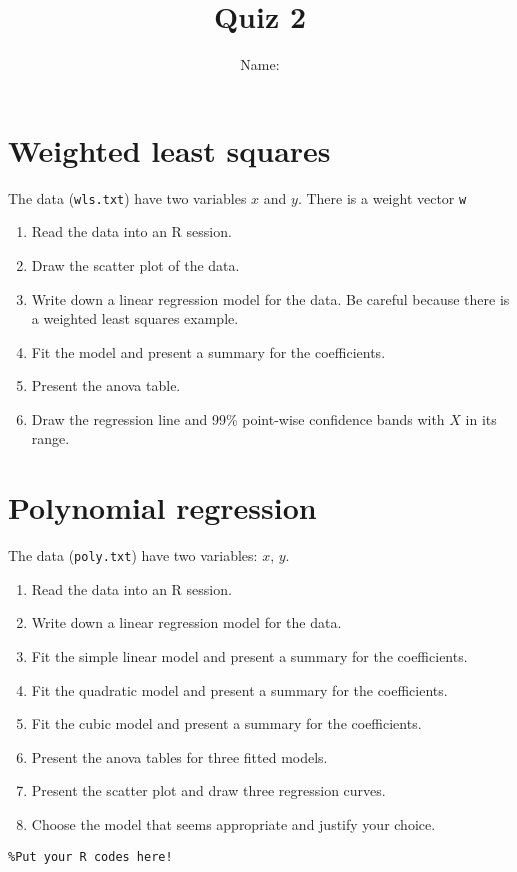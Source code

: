 \documentclass[12pt]{article}
\title{Quiz 2}
\author{Name:}%
\begin{document}
\maketitle

\section{Weighted least squares}
The data (\texttt{wls.txt}) have two variables $x$ and $y$. There is a weight vector \texttt{w}

\begin{enumerate}
\item Read the data into an R session.
\item Draw the scatter plot of the data.
\item Write down a linear regression model for the data. Be careful because there is a weighted least squares example.
\item Fit the model and present a summary for the coefficients.
\item Present the anova table.
\item Draw the regression line and 99\% point-wise confidence bands with $X$ in its range.
\end{enumerate}


\section{Polynomial regression}

The data (\texttt{poly.txt}) have two variables: $x$, $y$.


\begin{enumerate}
\item Read the data into an R session.
\item Write down a linear regression model for the data.
\item Fit the simple linear model and present a summary for the coefficients.
\item Fit the quadratic model and present a summary for the coefficients.
\item Fit the cubic model and present a summary for the coefficients.
\item Present the anova tables for three fitted models.
\item Present the scatter plot and draw three regression curves.
\item Choose the model that seems appropriate and justify your choice.
\end{enumerate}


\appendix
\begin{verbatim}
%Put your R codes here!
\end{verbatim}
\end{document}
